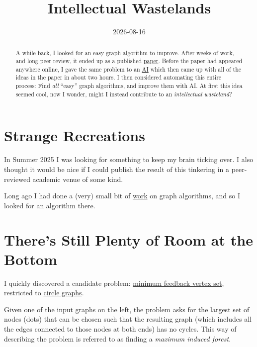 \documentclass[11pt]{article}
\title{Intellectual Wastelands}
\date{2026-08-16}
\begin{document}
\begin{abstract}
A while back, I looked for an easy graph algorithm to improve.
After weeks of work, and long peer review, it ended up as a published \href{https://doi.org/10.7155/jgaa.v30i1.3137}{paper}.
Before the paper had appeared anywhere online, I gave the same problem to an \href{https://chatgpt.com/share/6a8434d4-c278-83ed-aeb1-f2f0cd1bdb62}{AI}
which then came up with all of the ideas in the paper in about two hours. I then considered
automating this entire process: Find \textit{all} ``easy'' graph algorithms,
and improve them with AI. At first this idea seemed cool, now I wonder, might I instead contribute to an
\textit{intellectual wasteland}?
\end{abstract}

\section{Strange Recreations}

In Summer 2025 I was looking for something to keep my brain ticking over. I also thought it would be nice if
I could publish the result of this tinkering in a peer-reviewed academic venue of some kind.

Long ago I had done a (very) small bit of \href{https://researchrepository.ul.ie/server/api/core/bitstreams/12fd8a39-ae57-4f47-8301-1f5e231e78fc/content}{work} on graph algorithms, and so I looked for an algorithm there.

\section{There's Still Plenty of Room at the Bottom}

I quickly discovered a candidate problem: \href{https://www.graphclasses.org/classes/problem_Weighted_feedback_vertex_set.html}{minimum feedback vertex set}, restricted to \href{https://www.graphclasses.org/classes/gc_132.html}{circle graphs}.

Given one of the input graphs on the left, the problem asks for the largest set of nodes (dots) that can be chosen such that the resulting graph (which includes all the edges connected to those nodes at both ends) has no cycles.
This way of describing the problem is referred to as finding a \textit{maximum induced forest}.
\end{document}
